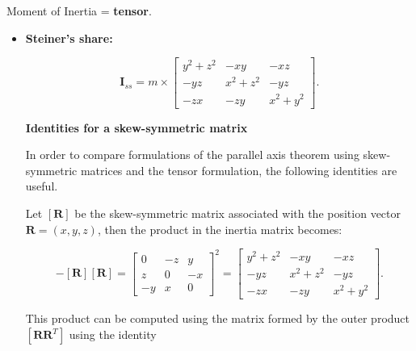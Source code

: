 Moment of Inertia = \textbf{tensor}.

\begin{itemize}
    \item \textbf{Steiner's share:}

        \begin{equation}
            \mathbf{I}_{ss} = m \times \begin{bmatrix}
                y^{2} + z^{2} & -xy & -xz \\
                -yz & x^{2} + z^{2} & -yz \\
                -zx & -zy & x^{2} + y^{2}
            \end{bmatrix}
        .\end{equation}

        \textbf{Identities for a skew-symmetric matrix}

        In order to compare formulations of the parallel axis theorem using
        skew-symmetric matrices and the tensor formulation, the following
        identities are useful.

        Let $[\mathbf{R}]$ be the skew-symmetric matrix associated with the
        position vector $\mathbf{R} = (x, y, z)$, then the product in
        the inertia matrix becomes:

        \begin{equation}
            -[\mathbf{R}][\mathbf{R}] = \begin{bmatrix}
                0 & -z & y \\
                z & 0 & -x \\
                -y & x & 0
            \end{bmatrix}^{2}
            = \begin{bmatrix}
                y^{2} + z^{2} & -xy & -xz \\
                -yz & x^{2} + z^{2} & -yz \\
                -zx & -zy & x^{2} + y^{2}
            \end{bmatrix}
        .\end{equation}

        This product can be computed using the matrix formed by the outer product
        $[\mathbf{R} \mathbf{R}^{T}]$ using the identity


\end{itemize}
